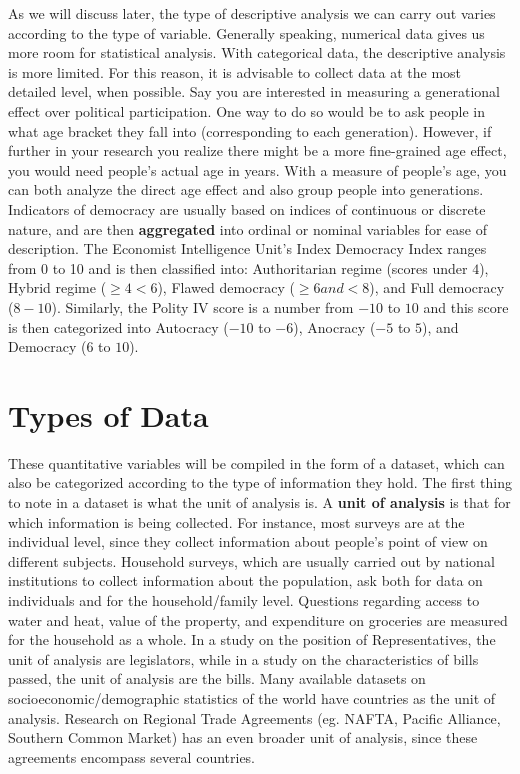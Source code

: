 \documentclass{book}
\begin{document}
As we will discuss later, the type of descriptive analysis we can carry out
varies according to the type of variable. Generally speaking, numerical data
gives us more room for statistical analysis. With categorical data, the
descriptive analysis is more limited. For this reason, it is advisable to
collect data at the most detailed level, when possible. Say you are interested
in measuring a generational effect over political participation. One way to do
so would be to ask people in what age bracket they fall into (corresponding to
each generation). However, if further in your research you realize there might
be a more fine-grained age effect, you would need people's actual age in
years. With a measure of people's age, you can both analyze the direct age
effect and also group people into generations. Indicators of democracy are
usually based on indices of continuous or discrete nature, and are then
\textbf{aggregated} into ordinal or nominal variables for ease of description.
The Economist Intelligence Unit's Index Democracy Index ranges from 0 to 10
and is then classified into: Authoritarian regime (scores under \(4\)), Hybrid
regime (\(\geq{4}<{6}\)), Flawed democracy (\(\geq{6} and <{8}\)), and Full
democracy (\(8-10\)). Similarly, the Polity IV score is a number from \(-10\)
to \(10\) and this score is then categorized into Autocracy (\(-10\) to
\(-6\)), Anocracy (\(-5\) to \(5\)), and Democracy (\(6\) to \(10\)).

\hypertarget{types-of-data}{%
\section{Types of Data}\label{types-of-data}}

These quantitative variables will be compiled in the form of a dataset, which
can also be categorized according to the type of information they hold. The
first thing to note in a dataset is what the unit of analysis is. A
\textbf{unit of analysis} is that for which information is being collected.
For instance, most surveys are at the individual level, since they collect
information about people's point of view on different subjects. Household
surveys, which are usually carried out by national institutions to collect
information about the population, ask both for data on individuals and for the
household/family level. Questions regarding access to water and heat, value of
the property, and expenditure on groceries are measured for the household as a
whole. In a study on the position of Representatives, the unit of analysis are
legislators, while in a study on the characteristics of bills passed, the unit
of analysis are the bills. Many available datasets on
socioeconomic/demographic statistics of the world have countries as the unit
of analysis. Research on Regional Trade Agreements (eg. NAFTA, Pacific
Alliance, Southern Common Market) has an even broader unit of analysis, since
these agreements encompass several countries.
\end{document}
